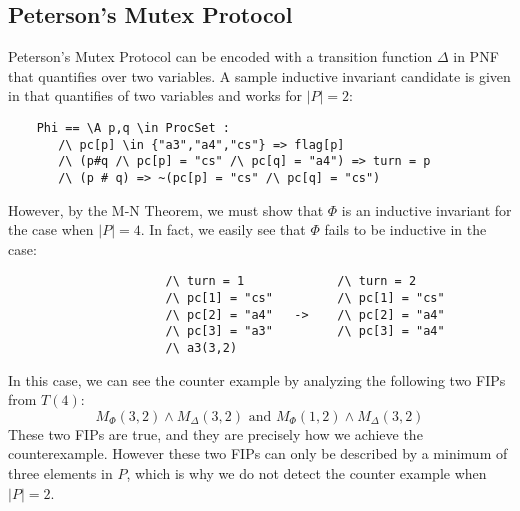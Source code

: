 \documentclass[12pt]{article}
\theoremstyle{definition}
\theoremstyle{remark}
\begin{document}
\subsection{Peterson's Mutex Protocol}
Peterson's Mutex Protocol can be encoded with a transition function $\Delta$ in PNF that quantifies over two variables.  A sample inductive invariant candidate is given in \cite{ian-peterson} that quantifies of two variables and works for $|P|=2$:
\begin{verbatim}
    Phi == \A p,q \in ProcSet :
       /\ pc[p] \in {"a3","a4","cs"} => flag[p]
       /\ (p#q /\ pc[p] = "cs" /\ pc[q] = "a4") => turn = p
       /\ (p # q) => ~(pc[p] = "cs" /\ pc[q] = "cs")
\end{verbatim}
However, by the M-N Theorem, we must show that $\Phi$ is an inductive invariant for the case when $|P|=4$.  In fact, we easily see that $\Phi$ fails to be inductive in the case:
\begin{verbatim}
                      /\ turn = 1             /\ turn = 2
                      /\ pc[1] = "cs"         /\ pc[1] = "cs"
                      /\ pc[2] = "a4"   ->    /\ pc[2] = "a4"
                      /\ pc[3] = "a3"         /\ pc[3] = "a4"
                      /\ a3(3,2)
\end{verbatim}
In this case, we can see the counter example by analyzing the following two FIPs from $T(4)$:
$$M_{\Phi}(3,2) \land M_{\Delta}(3,2) \text{ and } M_{\Phi}(1,2) \land M_{\Delta}(3,2)$$
These two FIPs are true, and they are precisely how we achieve the counterexample.  However these two FIPs can only be described by a minimum of three elements in $P$, which is why we do not detect the counter example when $|P|=2$.




\end{document}
